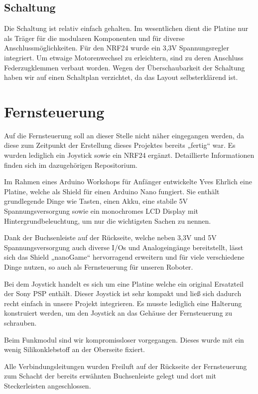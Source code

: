 \documentclass{article}
\begin{document}
\subsection{Schaltung}%

Die Schaltung ist relativ einfach gehalten. Im wesentlichen dient die Platine nur als Träger für die modularen Komponenten und für diverse Anschlussmöglichkeiten. Für den NRF24 wurde ein 3,3V Spannungsregler integriert.
Um etwaige Motorenwechsel zu erleichtern, sind zu deren Anschluss Federzugklemmen verbaut worden.
Wegen der Überschaubarkeit der Schaltung haben wir auf einen Schaltplan verzichtet, da das Layout selbsterklärend ist.

\newpage
\section{Fernsteuerung}%

Auf die Fernsteuerung soll an dieser Stelle nicht näher eingegangen werden, da diese zum Zeitpunkt der Erstellung dieses Projektes bereits „fertig“ war.
Es wurden lediglich ein Joystick sowie ein NRF24 ergänzt.
Detaillierte Informationen finden sich im dazugehörigen Repositorium\cite{nanoGame}.

Im Rahmen eines Arduino Workshops für Anfänger entwickelte Yves Ehrlich eine Platine, welche als Shield für einen Arduino Nano fungiert. Sie enthält grundlegende Dinge wie Tasten, einen Akku, eine stabile 5V Spannungsversorgung sowie ein monochromes LCD Display mit Hintergrundbeleuchtung, um nur die wichtigsten Sachen zu nennen.

Dank der Buchsenleiste auf der Rückseite, welche neben 3,3V und 5V Spannungsversorgung auch diverse I/Os und Analogeingänge bereitstellt, lässt sich das Shield „nanoGame“ hervorragend erweitern und für viele verschiedene Dinge nutzen, so auch als Fernsteuerung für unseren Roboter.

Bei dem Joystick handelt es sich um eine Platine welche ein original Ersatzteil der Sony PSP enthält. Dieser Joystick ist sehr kompakt und ließ sich dadurch recht einfach in unsere Projekt integrieren. Es musste lediglich eine Halterung konstruiert werden, um den Joystick an das Gehäuse der Fernsteuerung zu schrauben.

Beim Funkmodul sind wir kompromissloser vorgegangen. Dieses wurde mit ein wenig Silikonklebstoff an der Oberseite fixiert.

Alle Verbindungsleitungen wurden Freiluft auf der Rückseite der Fernsteuerung zum Schacht der bereits erwähnten Buchsenleiste gelegt und dort mit Steckerleisten angeschlossen.
\end{document}
